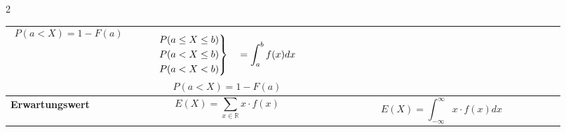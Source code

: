 \documentclass[10pt,a4paper,landscape]{article}
\begin{document}
\begin{multicols}{2}
{\begin{tabular}{|>{\centering\arraybackslash}m{0.2\linewidth}
					 |>{\centering\arraybackslash}m{0.32\linewidth}
					 |>{\centering\arraybackslash}m{0.4\linewidth}|}
\begin{equation*}
						                                                                                                                                                    P(a < X) = 1 - F(a)
					                                                                                                                                                    \end{equation*}  & $$\begin{rcases}
							                                                                                                                                                                         P(a \leq X \leq b) \\
							                                                                                                                                                                         P(a < X \leq b)    \\
							                                                                                                                                                                         P(a < X < b)
						                                                                                                                                                                         \end{rcases} \quad = \int_{a}^{b} f(x) dx$$ \newline \begin{equation*}
						                                                                                                                                                                                                                              P(a < X) = 1 - F(a)
					                                                                                                                                                                                                                              \end{equation*} \\
					 \hline
					 \textbf{Erwartungswert}                                               &
					 \begin{equation*}
						 E(X) = \sum_{x \in \mathbb{R}} x \cdot f(x)
					 \end{equation*}              &
					 \begin{equation*}
						 E(X) = \int_{-\infty}^{\infty} x \cdot f(x) dx
					 \end{equation*}                                                                                                                                                                                                   \\

\end{tabular}}
\end{multicols}
\end{document}
